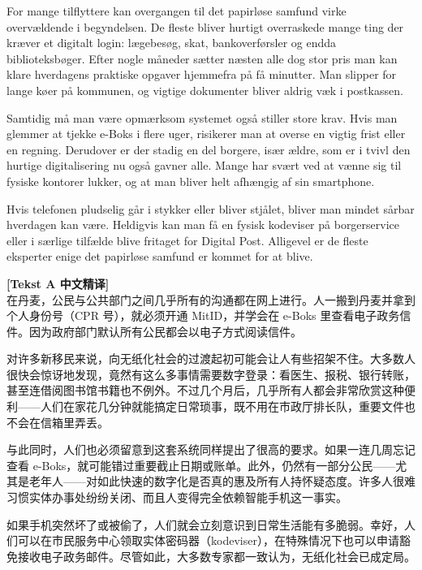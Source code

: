 For mange tilflyttere kan overgangen til det papirløse samfund virke overvældende i begyndelsen. De fleste bliver hurtigt overraskede  mange ting der kræver et digitalt login: lægebesøg, skat, bankoverførsler og endda biblioteksbøger. Efter nogle måneder sætter næsten alle dog stor pris  man kan klare hverdagens praktiske opgaver hjemmefra på få minutter. Man slipper for lange køer på kommunen, og vigtige dokumenter bliver aldrig væk i postkassen.

Samtidig må man være opmærksom  systemet også stiller store krav. Hvis man glemmer at tjekke e-Boks i flere uger, risikerer man at overse en vigtig frist eller en regning. Derudover er der stadig en del borgere, især ældre, som er i tvivl  den hurtige digitalisering nu også gavner alle. Mange har svært ved at vænne sig til  fysiske kontorer lukker, og at man bliver helt afhængig af sin smartphone.

Hvis telefonen pludselig går i stykker eller bliver stjålet, bliver man mindet  sårbar hverdagen kan være. Heldigvis kan man få en fysisk kodeviser på borgerservice eller i særlige tilfælde blive fritaget for Digital Post. Alligevel er de fleste eksperter enige  det papirløse samfund er kommet for at blive.

\begin{transbox}
\small
\textbf{\color{NCDTeal}[Tekst A 中文精译]}\\
在丹麦，公民与公共部门之间几乎所有的沟通都在网上进行。人一搬到丹麦并拿到个人身份号（CPR 号），就必须开通 MitID，并学会在 e-Boks 里查看电子政务信件。因为政府部门默认所有公民都会以电子方式阅读信件。

对许多新移民来说，向无纸化社会的过渡起初可能会让人有些招架不住。大多数人很快会惊讶地发现，竟然有这么多事情需要数字登录：看医生、报税、银行转账，甚至连借阅图书馆书籍也不例外。不过几个月后，几乎所有人都会非常欣赏这种便利——人们在家花几分钟就能搞定日常琐事，既不用在市政厅排长队，重要文件也不会在信箱里弄丢。

与此同时，人们也必须留意到这套系统同样提出了很高的要求。如果一连几周忘记查看 e-Boks，就可能错过重要截止日期或账单。此外，仍然有一部分公民——尤其是老年人——对如此快速的数字化是否真的惠及所有人持怀疑态度。许多人很难习惯实体办事处纷纷关闭、而且人变得完全依赖智能手机这一事实。

如果手机突然坏了或被偷了，人们就会立刻意识到日常生活能有多脆弱。幸好，人们可以在市民服务中心领取实体密码器（kodeviser），在特殊情况下也可以申请豁免接收电子政务邮件。尽管如此，大多数专家都一致认为，无纸化社会已成定局。
\end{transbox}

